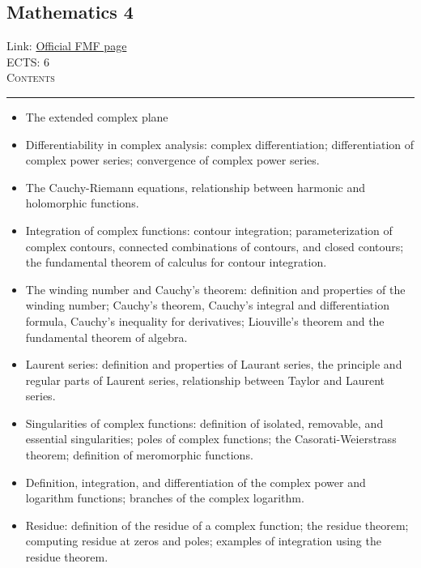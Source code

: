 \documentclass[11pt, a4paper]{article}
\newenvironment{course}[3]{
\subsection{#1}%
Link: \href{#2}{Official FMF page}\\%
ECTS: #3%
\vspace{1ex}
\\
{\large \textsc{Contents}}\\[-0.9ex]%
\rule{\textwidth}{0.5pt}
\vspace{-3ex}
}
{}
\newenvironment{chapter}[1]{
\begin{tcolorbox}[title=#1, breakable]
}
{\end{tcolorbox}}
\begin{document}
\begin{course}{Mathematics 4}{https://www.fmf.uni-lj.si/en/study-physics/programmes/1fiz/2020/7000777/courses/523/}{6}
    \label{mathematics-4}

    \begin{chapter}{Complex analysis}
        \begin{itemize}
        
            \item The extended complex plane

            \item Differentiability in complex analysis: complex differentiation; differentiation of complex power series; convergence of complex power series.

            \item The Cauchy-Riemann equations, relationship between harmonic and holomorphic functions.

            \item Integration of complex functions: contour integration; parameterization of complex contours, connected combinations of contours, and closed contours; the fundamental theorem of calculus for contour integration.

            \item The winding number and Cauchy's theorem: definition and properties of the winding number; Cauchy's theorem, Cauchy's integral and differentiation formula, Cauchy's inequality for derivatives; Liouville's theorem and the fundamental theorem of algebra.

            \item Laurent series: definition and properties of Laurant series, the principle and regular parts of Laurent series, relationship between Taylor and Laurent series.

            \item Singularities of complex functions: definition of isolated, removable, and essential singularities; poles of complex functions; the Casorati-Weierstrass theorem; definition of meromorphic functions.

            \item Definition, integration, and differentiation of the complex power and logarithm functions; branches of the complex logarithm.

            \item Residue: definition of the residue of a complex function; the residue theorem; computing residue at zeros and poles; examples of integration using the residue theorem.


\end{itemize}
\end{chapter}
\end{course}
\end{document}
